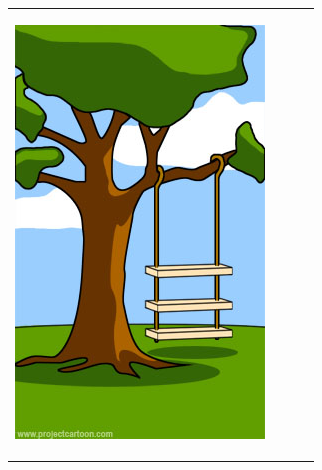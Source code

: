\bgroup
\def\arraystretch{1.2}
\begin{tabularx}{\textwidth}{XXXX}
\begin{minipage}[t]{0.23\textwidth}
\begin{center}
\includegraphics[width=1.0\textwidth]{./inf/SEKII/29_Softwaretechnik/PM_01.jpg}


\end{center}
\end{minipage}
\end{tabularx}
